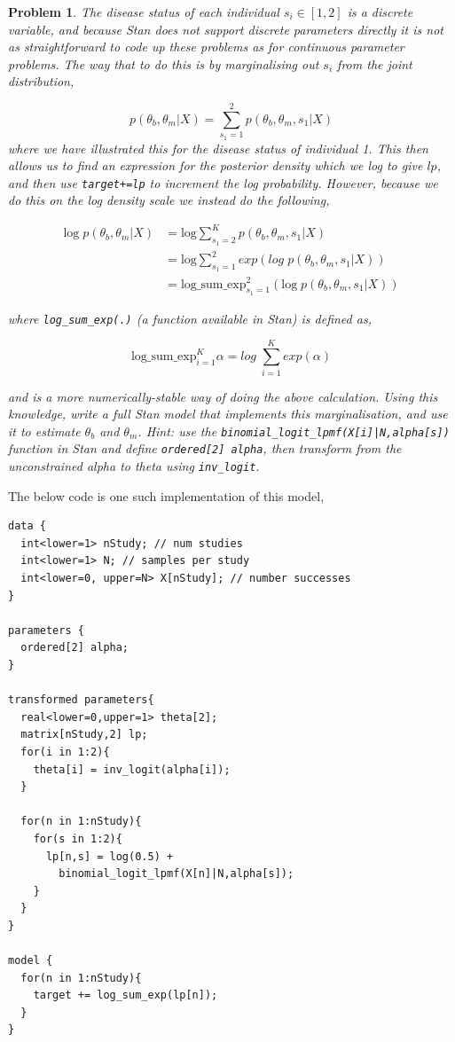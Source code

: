 \documentclass{article}
\newtheorem{problem}{Problem}[section]
\begin{document}
\begin{problem}
	The disease status of each individual $s_i\in[1,2]$ is a discrete variable, and because Stan does not support discrete parameters directly it is not as straightforward to code up these problems as for continuous parameter problems. The way that to do this is by marginalising out $s_i$ from the joint distribution,
	
	\begin{equation}
	p(\theta_b,\theta_m|X) = \sum_{s_1=1}^{2} p(\theta_b,\theta_m,s_1|X)
	\end{equation}
	where we have illustrated this for the disease status of individual 1. This then allows us to find an expression for the posterior density which we log to give $lp$, and then use \texttt{target+=lp} to increment the log probability. However, because we do this on the log density scale we instead do the following,
	
	\begin{align}
	\text{log} \; p(\theta_b,\theta_m|X) &= \text{log} \sum_{s_1=2}^{K} p(\theta_b,\theta_m,s_1|X)\\
	&= \text{log} \sum_{s_1=1}^{2} exp\left( log\; p(\theta_b,\theta_m,s_1|X)\right)\\
	&= \text{log}\_\text{sum}\_\text{exp}_{s_1=1}^{2}(\text{log}\; p(\theta_b,\theta_m,s_1|X))
	\end{align}
	
	where \texttt{log_sum_exp(.)} (a function available in Stan) is defined as,
	
	\begin{equation}
	\text{log\_sum\_exp}_{i=1}^{K} \alpha = log\; \sum_{i=1}^{K} exp(\alpha) 
	\end{equation}
	
	and is a more numerically-stable way of doing the above calculation. Using this knowledge, write a full Stan model that implements this marginalisation, and use it to estimate $\theta_b$ and $\theta_m$. Hint: use the \texttt{binomial_logit_lpmf(X[i]|N,alpha[s])} function in Stan and define \texttt{ordered[2] alpha}, then transform from the unconstrained alpha to theta using \texttt{inv_logit}.
\end{problem}

The below code is one such implementation of this model,

\begin{verbatim}
data { 
  int<lower=1> nStudy; // num studies
  int<lower=1> N; // samples per study
  int<lower=0, upper=N> X[nStudy]; // number successes
} 

parameters { 
  ordered[2] alpha; 
}

transformed parameters{
  real<lower=0,upper=1> theta[2];
  matrix[nStudy,2] lp;
  for(i in 1:2){
    theta[i] = inv_logit(alpha[i]);
  }

  for(n in 1:nStudy){
    for(s in 1:2){
      lp[n,s] = log(0.5) + 
        binomial_logit_lpmf(X[n]|N,alpha[s]);
    }
  }
}

model { 
  for(n in 1:nStudy){
    target += log_sum_exp(lp[n]);
  }
}
\end{verbatim}
\end{document}
